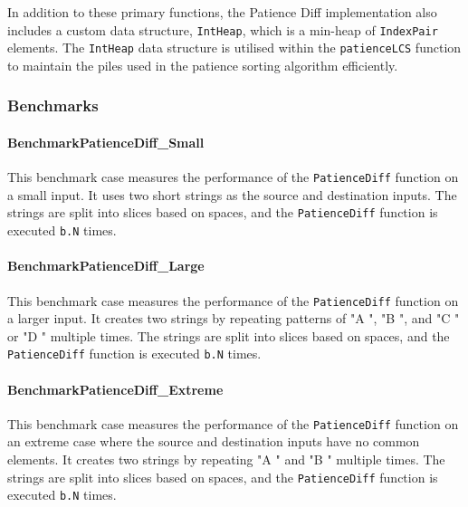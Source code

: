 In addition to these primary functions, the Patience Diff implementation also includes a custom data structure, \lstinline{IntHeap}, which is a min-heap of \lstinline{IndexPair} elements. The \lstinline{IntHeap} data structure is utilised within the \lstinline{patienceLCS} function to maintain the piles used in the patience sorting algorithm efficiently.

\subsubsection*{Benchmarks}

\paragraph{BenchmarkPatienceDiff\_Small}
This benchmark case measures the performance of the \lstinline{PatienceDiff} function on a small input. It uses two short strings as the source and destination inputs. The strings are split into slices based on spaces, and the \lstinline{PatienceDiff} function is executed \lstinline{b.N} times.

\paragraph{BenchmarkPatienceDiff\_Large}
This benchmark case measures the performance of the \lstinline{PatienceDiff} function on a larger input. It creates two strings by repeating patterns of "A ", "B ", and "C " or "D " multiple times. The strings are split into slices based on spaces, and the \lstinline{PatienceDiff} function is executed \lstinline{b.N} times.

\paragraph{BenchmarkPatienceDiff\_Extreme}
This benchmark case measures the performance of the \lstinline{PatienceDiff} function on an extreme case where the source and destination inputs have no common elements. It creates two strings by repeating "A " and "B " multiple times. The strings are split into slices based on spaces, and the \lstinline{PatienceDiff} function is executed \lstinline{b.N} times.